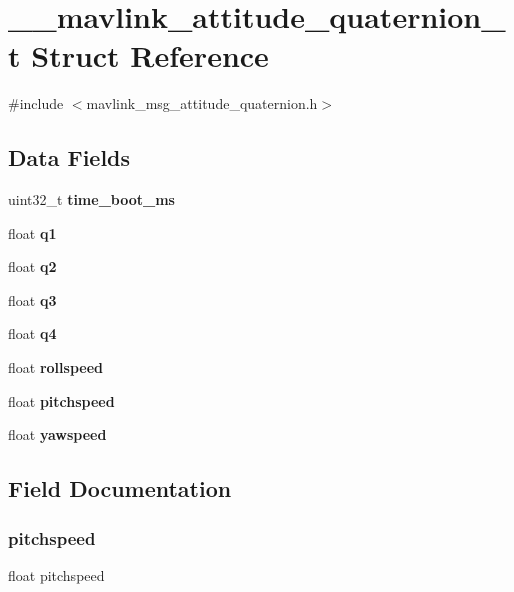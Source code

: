 \section{\+\_\+\+\_\+mavlink\+\_\+attitude\+\_\+quaternion\+\_\+t Struct Reference}
\label{struct____mavlink__attitude__quaternion__t}


{\ttfamily \#include $<$mavlink\+\_\+msg\+\_\+attitude\+\_\+quaternion.\+h$>$}

\subsection*{Data Fields}
\begin{DoxyCompactItemize}
\item 
uint32\+\_\+t \textbf{ time\+\_\+boot\+\_\+ms}
\item 
float \textbf{ q1}
\item 
float \textbf{ q2}
\item 
float \textbf{ q3}
\item 
float \textbf{ q4}
\item 
float \textbf{ rollspeed}
\item 
float \textbf{ pitchspeed}
\item 
float \textbf{ yawspeed}
\end{DoxyCompactItemize}


\subsection{Field Documentation}
\mbox{\label{struct____mavlink__attitude__quaternion__t_abd92124e4ea5164ccec676c82e026984}} 
\subsubsection{pitchspeed}
{\footnotesize\ttfamily float pitchspeed}

\mbox{\label{struct____mavlink__attitude__quaternion__t_a209c65446ca302d32cbb908c4d75f616}} 
